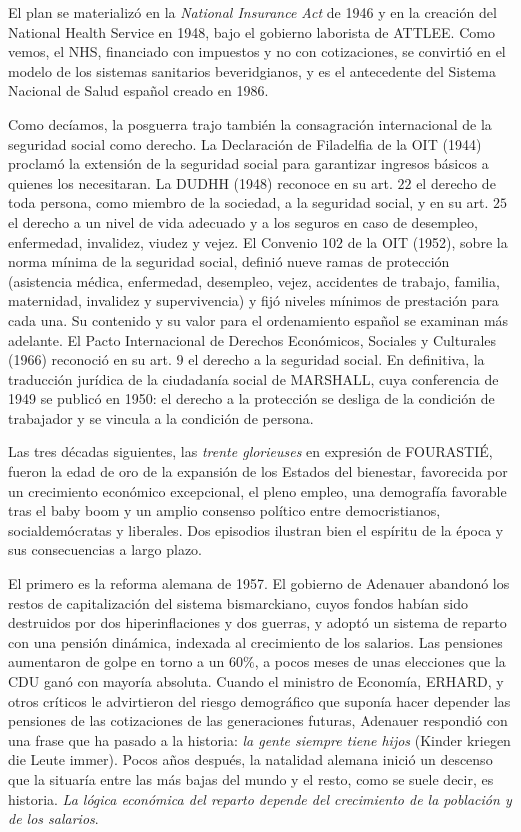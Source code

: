 \documentclass[10pt,a4paper]{article}
\begin{document}
El plan se materializó en la \textit{National Insurance Act} de 1946 y en la creación del National Health Service en 1948, bajo el gobierno laborista de ATTLEE. Como vemos, el NHS, financiado con impuestos y no con cotizaciones, se convirtió en el modelo de los sistemas sanitarios beveridgianos, y es el antecedente del Sistema Nacional de Salud español creado en 1986.

Como decíamos, la posguerra trajo también la consagración internacional de la seguridad social como derecho. La Declaración de Filadelfia de la OIT (1944) proclamó la extensión de la seguridad social para garantizar ingresos básicos a quienes los necesitaran. La DUDHH (1948) reconoce en su art. $22$ el derecho de toda persona, como miembro de la sociedad, a la seguridad social, y en su art. $25$ el derecho a un nivel de vida adecuado y a los seguros en caso de desempleo, enfermedad, invalidez, viudez y vejez. El Convenio $102$ de la OIT (1952), sobre la norma mínima de la seguridad social, definió nueve ramas de protección (asistencia médica, enfermedad, desempleo, vejez, accidentes de trabajo, familia, maternidad, invalidez y supervivencia) y fijó niveles mínimos de prestación para cada una. Su contenido y su valor para el ordenamiento español se examinan más adelante. El Pacto Internacional de Derechos Económicos, Sociales y Culturales (1966) reconoció en su art. $9$ el derecho a la seguridad social. En definitiva, la traducción jurídica de la ciudadanía social de MARSHALL, cuya conferencia de 1949 se publicó en 1950: el derecho a la protección se desliga de la condición de trabajador y se vincula a la condición de persona.

Las tres décadas siguientes, las \textit{trente glorieuses} en expresión de FOURASTIÉ, fueron la edad de oro de la expansión de los Estados del bienestar, favorecida por un crecimiento económico excepcional, el pleno empleo, una demografía favorable tras el baby boom y un amplio consenso político entre democristianos, socialdemócratas y liberales. Dos episodios ilustran bien el espíritu de la época y sus consecuencias a largo plazo.

El primero es la reforma alemana de 1957. El gobierno de Adenauer abandonó los restos de capitalización del sistema bismarckiano, cuyos fondos habían sido destruidos por dos hiperinflaciones y dos guerras, y adoptó un sistema de reparto con una pensión dinámica, indexada al crecimiento de los salarios. Las pensiones aumentaron de golpe en torno a un $60\%$, a pocos meses de unas elecciones que la CDU ganó con mayoría absoluta. Cuando el ministro de Economía, ERHARD, y otros críticos le advirtieron del riesgo demográfico que suponía hacer depender las pensiones de las cotizaciones de las generaciones futuras, Adenauer respondió con una frase que ha pasado a la historia: \textit{la gente siempre tiene hijos} (Kinder kriegen die Leute immer). Pocos años después, la natalidad alemana inició un descenso que la situaría entre las más bajas del mundo y el resto, como se suele decir, es historia. \textit{La lógica económica del reparto depende del crecimiento de la población y de los salarios}.
\end{document}
